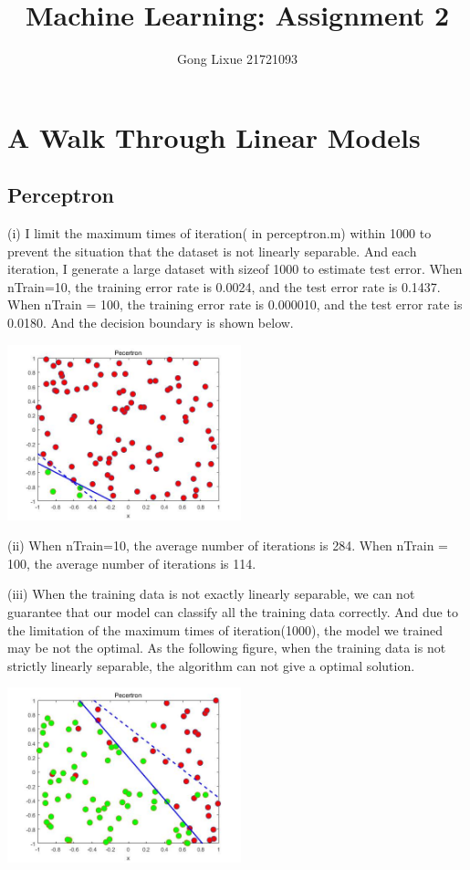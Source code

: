\documentclass[11pt]{article} %
\title{Machine Learning: Assignment 2}
\author{Gong Lixue 21721093}
\begin{document}
\maketitle

\section{A Walk Through Linear Models}

\subsection{Perceptron}

(i) I limit the maximum times of iteration( in perceptron.m) within 1000 to prevent the situation that the dataset is not linearly separable. And each iteration, I generate a large dataset with sizeof 1000 to estimate test error.
When nTrain=10, the training error rate is 0.0024, and the test error rate is 0.1437. 
When nTrain = 100, the training error rate is 0.000010, and the test error rate is 0.0180.  And the decision boundary is shown below.

\begin{center}
\includegraphics[height=2in]{./Perceptron_i.jpg}
\end{center}

(ii) When nTrain=10, the average number of iterations is 284.
When nTrain = 100, the average number of iterations is 114.

(iii) When the training data is not exactly linearly separable, we can not guarantee that our model can classify all the training data correctly. And due to the limitation of the maximum times of iteration(1000), the model we trained may be not the optimal. As the following figure, when the training data is not strictly linearly separable, the algorithm can not give a optimal solution.

\begin{center}
\includegraphics[height=2in]{./Perceptron_nonlinear.jpg}
\end{center}
\end{document}

